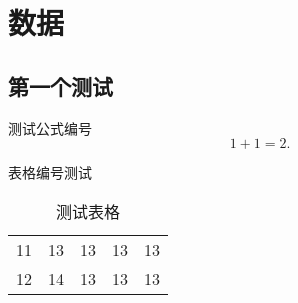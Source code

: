 
\chapter{数据}

\section{第一个测试}
测试公式编号
\begin{equation}
  1+1=2.
\end{equation}

表格编号测试

\begin{table}[h]
  \centering
  \caption{测试表格}
  \begin{tabular}{*{5}c}
    \hline
    11 & 13  & 13  & 13  & 13 \\
    12 & 14  & 13  & 13  & 13 \\
    \hline
  \end{tabular}
\end{table}